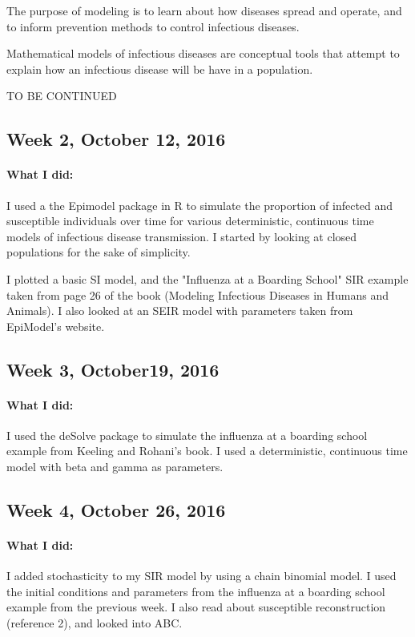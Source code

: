 \documentclass{article}
\begin{document}
The purpose of modeling is to learn about how diseases spread and operate, and to inform prevention methods to control infectious diseases. 

Mathematical models of infectious diseases are conceptual tools that attempt to explain how an infectious disease will be have in a population. 

TO BE CONTINUED

\subsection{Week 2, October 12, 2016}

\paragraph{What I did:}

I used a the Epimodel package in R to simulate the proportion of infected and susceptible individuals over time for various deterministic, continuous time models of infectious disease transmission. I started by looking at closed populations for the sake of simplicity. 

I plotted a basic SI model, and the "Influenza at a Boarding School" SIR example taken from page 26 of the book (Modeling Infectious Diseases in Humans and Animals). I also looked at an SEIR model with parameters taken from EpiModel's website. 

\subsection{Week 3, October19, 2016}

    \paragraph{What I did:}
    I used the deSolve package to simulate the influenza at a boarding school example from Keeling and Rohani's book. I used a deterministic, continuous time model with beta and gamma as parameters. 

\subsection{Week 4, October 26, 2016}
	
	\paragraph{What I did:}
	I added stochasticity to my SIR model by using a chain binomial model. I used the initial conditions and parameters from the influenza at a boarding school example from the previous week. I also read about susceptible reconstruction (reference 2), and looked into ABC. 
\end{document}
